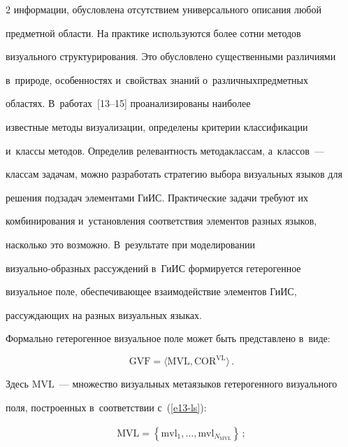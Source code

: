 \begin{multicols}{2}
информации, обусловлена отсутствием универсального описания любой 


предметной области. На практике используются более сотни методов 


визуального структурирования. Это обусловлено существенными различиями 


в~природе, особенностях и~свойствах знаний о~различных\linebreak предметных 


областях. В~работах~[13--15] проанализированы наиболее 


известные методы визуализации, определены критерии классификации 


и~классы методов. Определив релевантность метода\linebreak классам, а~классов~--- 


классам задачам, можно разработать стратегию выбора визуальных языков для 


решения подзадач элементами ГиИС. Практические задачи требуют их 


комбинирования и~установления соответствия элементов разных языков, 


насколько это возможно. В~результате при моделировании  


ви\-зу\-аль\-но-об\-раз\-ных рассуждений в~ГиИС формируется гетерогенное 


визуальное поле, обеспечивающее взаимодействие элементов ГиИС, 


рассуждающих на разных визуальных языках.


  


  Формально гетерогенное визуальное поле может быть представлено в~виде:


  \begin{equation}


  \mathrm{GVF}=\langle \mathrm{MVL}, \mathrm{COR}^{\mathrm{VL}}\rangle\,.


  \label{e14-ls}


  \end{equation}


Здесь $\mathrm{MVL}$~--- множество визуальных метаязыков гетерогенного визуального 


поля, построенных в~соответствии с~(\ref{e13-ls}):


  \begin{gather*}


  \mathrm{MVL}=\left\{ \mathrm{mvl}_1,\ldots , \mathrm{mvl}_{N_{\mathrm{MVL}}}\right\}\,;



\end{gather*}
\end{multicols}
